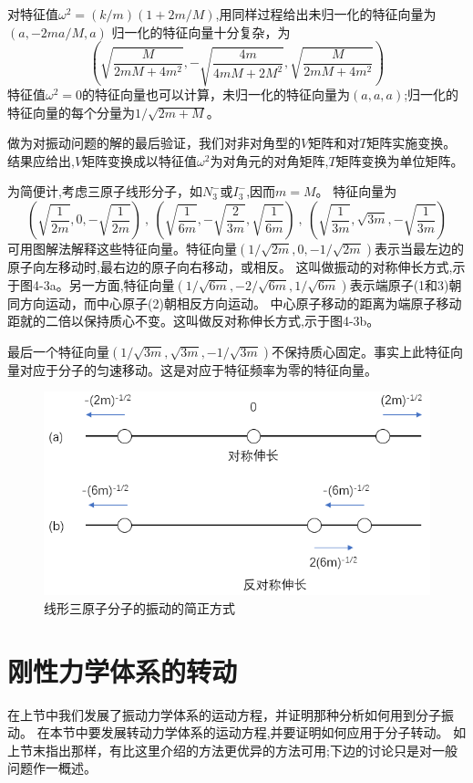 对特征值$\omega^2=(k/m)(1+2m/M)$,用同样过程给出未归一化的特征向量为$(a,-2ma/M,a)$
归一化的特征向量十分复杂，为
\[\left(\sqrt{\frac{M}{2mM+4m^2}},-\sqrt{\frac{4m}{4mM+2M^2}},\sqrt{\frac{M}{2mM+4m^2}}\right)\]
特征值$\omega^2=0$的特征向量也可以计算，未归一化的特征向量为$(a,a,a)$;归一化的特征向量的每个分量为$1/\sqrt{2m+M}$。

做为对振动问题的解的最后验证，我们对非对角型的$V$矩阵和对$T$矩阵实施变换。
结果应给出,$V$矩阵变换成以特征值$\omega^2$为对角元的对角矩阵,$T$矩阵变换为单位矩阵。

为简便计,考虑三原子线形分子，如$N_3^-$或$I_3^-$,因而$m=M$。
特征向量为
\[\left(\sqrt{\frac{1}{2m}},0,-\sqrt{\frac{1}{2m}}\right) \ , \ 
\left(\sqrt{\frac{1}{6m}},-\sqrt{\frac{2}{3m}},\sqrt{\frac{1}{6m}}\right) \ , \ 
\left(\sqrt{\frac{1}{3m}},\sqrt{3m},-\sqrt{\frac{1}{3m}}\right)\]
可用图解法解释这些特征向量。特征向量$(1/\sqrt{2m},0,-1/\sqrt{2m})$表示当最左边的原子向左移动时,最右边的原子向右移动，或相反。
这叫做振动的对称伸长方式,示于图4-3a。另一方面,特征向量$(1/\sqrt{6m},-2/\sqrt{6m},1/\sqrt{6m})$表示端原子(1和3)朝同方向运动，而中心原子(2)朝相反方向运动。
中心原子移动的距离为端原子移动距就的二倍以保持质心不变。这叫做反对称伸长方式,示于图4-3b。

最后一个特征向量$(1/\sqrt{3m},\sqrt{3m},-1/\sqrt{3m})$不保持质心固定。事实上此特征向量对应于分子的匀速移动。这是对应于特征频率为零的特征向量。

\begin{figure}[htbp]
    \centering
    \includegraphics[scale=0.5]{./fig/4-3.png}
    \caption{线形三原子分子的振动的简正方式}
\end{figure}

\section{刚性力学体系的转动}
在上节中我们发展了振动力学体系的运动方程，并证明那种分析如何用到分子振动。
在本节中要发展转动力学体系的运动方程,并要证明如何应用于分子转动。
如上节末指出那样，有比这里介绍的方法更优异的方法可用;下边的讨论只是对一般问题作一概述。


